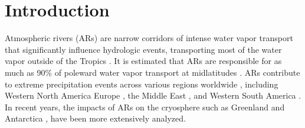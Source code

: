 \documentclass[12pts,draft]{AR_analysis_}
\begin{document}
%
%
%
%



\section{Introduction}

Atmospheric rivers (ARs) are narrow corridors of intense water vapor
transport that significantly influence hydrologic events, transporting
most of the water vapor outside of the Tropics \cite{NOAA_AR_summary}.
It is estimated that ARs are responsible for as much as 90\% of poleward
water vapor transport at midlatitudes \cite{other_alg}. ARs contribute to
extreme precipitation events across various regions worldwide 
\cite{Espinoza2018, Massoud2019}, including
Western North America \cite{Dettinger2004, Neiman2008, Guan2010,
ARs_flood_WA_State, ARs_flood_Russian_River_CA, Ralph2013, ARs_CA}
Europe \cite{Lavers2013, ARs_impact_Norway}, the Middle East \cite{massoud2020, 
Lashkari2020,  Esfandiari2024}, and Western South America
\cite{ARs_impact_SA}. In recent years, the impacts of ARs on the cryosphere
such as Greenland \cite{Mattingly2018} and Antarctica \cite{Gorodetskaya2014, 
Wille2021}, have been more extensively analyzed. 
\end{document}
